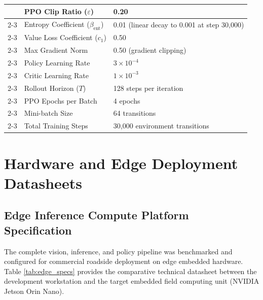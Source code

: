 \documentclass[12pt,a4paper,oneside]{report}
\begin{document}
\begin{table}[htbp]
\begin{tabularx}{\textwidth}{|p{3.5cm}|p{4.2cm}|X|}
& PPO Clip Ratio ($\varepsilon$) & 0.20 \\ \cline{2-3}
& Entropy Coefficient ($\beta_{\text{ent}}$) & 0.01 (linear decay to 0.001 at step 30,000) \\ \cline{2-3}
& Value Loss Coefficient ($c_1$) & 0.50 \\ \cline{2-3}
& Max Gradient Norm & 0.50 (gradient clipping) \\ \cline{2-3}
& Policy Learning Rate & $3 \times 10^{-4}$ \\ \cline{2-3}
& Critic Learning Rate & $1 \times 10^{-3}$ \\ \cline{2-3}
& Rollout Horizon ($T$) & 128 steps per iteration \\ \cline{2-3}
& PPO Epochs per Batch & 4 epochs \\ \cline{2-3}
& Mini-batch Size & 64 transitions \\ \cline{2-3}
& Total Training Steps & 30,000 environment transitions \\ \hline
\end{tabularx}
\end{table}

\chapter{Hardware and Edge Deployment Datasheets}
\label{app:datasheets}

\section{Edge Inference Compute Platform Specification}
The complete vision, inference, and policy pipeline was benchmarked and configured for commercial roadside deployment on edge embedded hardware. Table \ref{tab:edge_specs} provides the comparative technical datasheet between the development workstation and the target embedded field computing unit (NVIDIA Jetson Orin Nano).
\end{document}
